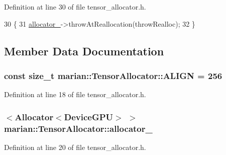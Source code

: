 Definition at line 30 of file tensor\+\_\+allocator.\+h.


\begin{DoxyCode}
30                                               \{
31     \hyperlink{classmarian_1_1TensorAllocator_a6ec91978079a354f9825f163bfccb49c}{allocator\_}->throwAtReallocation(throwRealloc);
32   \}
\end{DoxyCode}


\subsection{Member Data Documentation}
\subsubsection[{\texorpdfstring{A\+L\+I\+GN}{ALIGN}}]{\setlength{\rightskip}{0pt plus 5cm}const size\+\_\+t marian\+::\+Tensor\+Allocator\+::\+A\+L\+I\+GN = 256\hspace{0.3cm}{\ttfamily [private]}}\hypertarget{classmarian_1_1TensorAllocator_a1d78bd3426a9991d772af679eeaca162}{}\label{classmarian_1_1TensorAllocator_a1d78bd3426a9991d772af679eeaca162}


Definition at line 18 of file tensor\+\_\+allocator.\+h.

\subsubsection[{\texorpdfstring{allocator\+\_\+}{allocator_}}]{$<${\bf Allocator}$<${\bf Device\+G\+PU}$>$ $>$ marian\+::\+Tensor\+Allocator\+::allocator\+\_\+\hspace{0.3cm}{\ttfamily [private]}}\hypertarget{classmarian_1_1TensorAllocator_a6ec91978079a354f9825f163bfccb49c}{}\label{classmarian_1_1TensorAllocator_a6ec91978079a354f9825f163bfccb49c}


Definition at line 20 of file tensor\+\_\+allocator.\+h.

